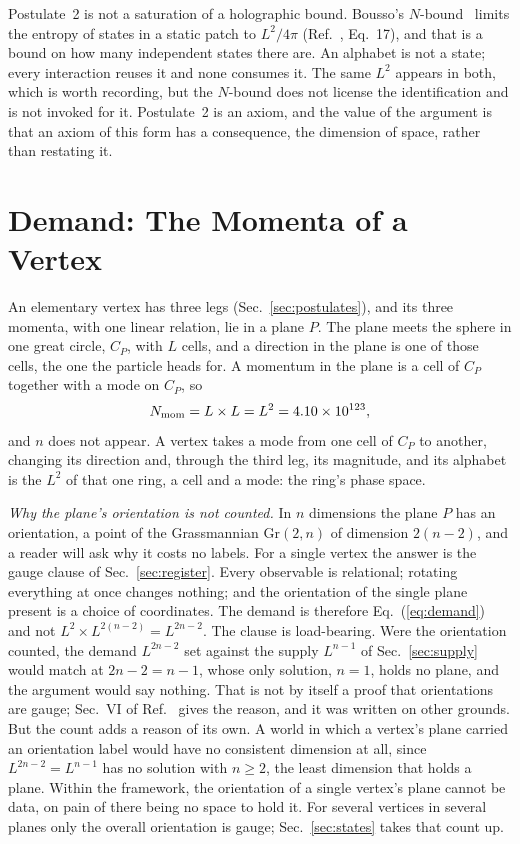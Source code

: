 \documentclass[aps,prd,twocolumn,superscriptaddress,nofootinbib]{revtex4-2}
\begin{document}
Postulate~2 is not a saturation of a holographic bound. Bousso's $N$-bound~\cite{bousso2000} limits the entropy of states in a static patch to $L^2/4\pi$ (Ref.~\cite{korytko2026c}, Eq.~17), and that is a bound on how many independent states there are. An alphabet is not a state; every interaction reuses it and none consumes it. The same $L^2$ appears in both, which is worth recording, but the $N$-bound does not license the identification and is not invoked for it. Postulate~2 is an axiom, and the value of the argument is that an axiom of this form has a consequence, the dimension of space, rather than restating it.

\section{Demand: The Momenta of a Vertex}
\label{sec:demand}

An elementary vertex has three legs (Sec.~\ref{sec:postulates}), and its three momenta, with one linear relation, lie in a plane $P$. The plane meets the sphere in one great circle, $C_P$, with $L$ cells, and a direction in the plane is one of those cells, the one the particle heads for. A momentum in the plane is a cell of $C_P$ together with a mode on $C_P$, so
\begin{equation}
N_{\rm mom} = L\times L = L^2 = 4.10\times10^{123},
\label{eq:demand}
\end{equation}
and $n$ does not appear. A vertex takes a mode from one cell of $C_P$ to another, changing its direction and, through the third leg, its magnitude, and its alphabet is the $L^2$ of that one ring, a cell and a mode: the ring's phase space.

\textit{Why the plane's orientation is not counted.} In $n$ dimensions the plane $P$ has an orientation, a point of the Grassmannian $\mathrm{Gr}(2,n)$ of dimension $2(n-2)$, and a reader will ask why it costs no labels. For a single vertex the answer is the gauge clause of Sec.~\ref{sec:register}. Every observable is relational; rotating everything at once changes nothing; and the orientation of the single plane present is a choice of coordinates. The demand is therefore Eq.~(\ref{eq:demand}) and not $L^2\times L^{2(n-2)} = L^{2n-2}$. The clause is load-bearing. Were the orientation counted, the demand $L^{2n-2}$ set against the supply $L^{n-1}$ of Sec.~\ref{sec:supply} would match at $2n-2 = n-1$, whose only solution, $n = 1$, holds no plane, and the argument would say nothing. That is not by itself a proof that orientations are gauge; Sec.~VI of Ref.~\cite{korytko2026c} gives the reason, and it was written on other grounds. But the count adds a reason of its own. A world in which a vertex's plane carried an orientation label would have no consistent dimension at all, since $L^{2n-2} = L^{n-1}$ has no solution with $n \ge 2$, the least dimension that holds a plane. Within the framework, the orientation of a single vertex's plane cannot be data, on pain of there being no space to hold it. For several vertices in several planes only the overall orientation is gauge; Sec.~\ref{sec:states} takes that count up.
\end{document}
